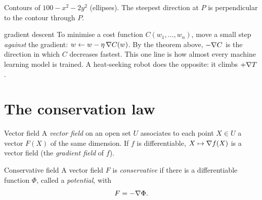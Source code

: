 \begin{center}

{\small\color{navy} Contours of $100-x^2-2y^2$ (ellipses). The steepest direction at $P$ is
perpendicular to the contour through $P$.}
\end{center}

\begin{reallife}{gradient descent}
To minimise a cost function $C(w_1,\dots,w_n)$, move a small step \emph{against} the
gradient: $w\leftarrow w-\eta\,\nabla C(w)$. By the theorem above, $-\nabla C$ is the
direction in which $C$ decreases fastest. This one line is how almost every machine
learning model is trained. A heat-seeking robot does the opposite: it climbs $+\nabla T$.
\end{reallife}

\section{The conservation law}

\begin{definition}{Vector field}
A \emph{vector field} on an open set $U$ associates to each point $X\in U$ a vector
$F(X)$ of the same dimension. If $f$ is differentiable, $X\mapsto\nabla f(X)$ is a vector
field (the \emph{gradient field} of $f$).
\end{definition}

\begin{definition}{Conservative field}
A vector field $F$ is \emph{conservative} if there is a differentiable function $\Phi$,
called a \emph{potential}, with
\[ F=-\nabla\Phi . \]
\end{definition}

